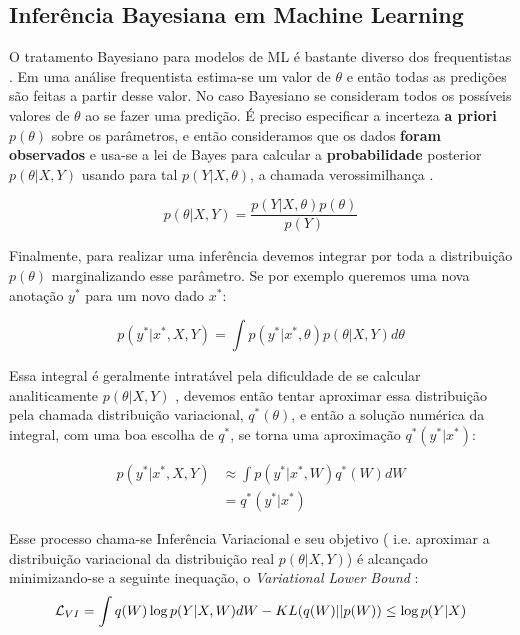 \subsection{Inferência Bayesiana em Machine Learning}
\label{sec:bayesinf}
O tratamento Bayesiano para modelos de ML é bastante diverso dos frequentistas \citep{dlbook}.
Em uma análise frequentista estima-se um valor de $\theta$ e então todas as
predições são feitas a partir desse valor. No caso Bayesiano se consideram todos
os possíveis valores de $\theta$ ao se fazer uma predição. É preciso especificar
a incerteza \textbf{a priori} $p(\theta)$ sobre os parâmetros, e então
consideramos que os dados \textbf{foram observados} e usa-se a lei de Bayes para
calcular a \textbf{probabilidade} posterior $p(\theta | X,Y)$ usando para tal
$p(Y |X, \theta)$, a chamada verossimilhança \citep{bayesml}. 

\[    p(\theta | X,Y) = \frac{p(Y| X,\theta) p(\theta)}{p(Y)}   \]

Finalmente, para realizar uma inferência devemos integrar por toda a distribuição $p(\theta)$ marginalizando esse parâmetro. Se por exemplo queremos uma nova anotação $y^*$ para um novo dado $x^*$:


\begin{equation}
  \label{eq:int}
p(y^* | x^* , X,Y) = \int  p(y^* | x^*,\theta) p(\theta | X,Y)  d\theta 
\end{equation}

Essa integral é geralmente intratável pela dificuldade de se calcular
analiticamente $p(\theta | X,Y)$ \citep{ubertime}, devemos então tentar aproximar essa distribuição
pela chamada distribuição variacional, $q^*(\theta)$, e então a solução numérica da integral, com uma boa escolha de $q^{*}$, se torna uma aproximação $q^{*}(y^{*}| x^{*})$: 

\begin{align*}
  \label {eq:pq}
    p(y^* | x^* , X,Y) &\approx \int  p(y^* | x^*,W) q^*(W)dW \\
                       &= q^*(y^* | x^*)
\end{align*}

Esse processo chama-se Inferência Variacional e seu objetivo ( i.e. aproximar a distribuição variacional da distribuição real $p(\theta | X,Y)$)
é alcançado minimizando-se a seguinte inequação, o \textit{Variational Lower Bound} \citep{bayesml}: \\

\begin{equation}
  \label {eq:ine}
  \mathcal{L}_{VI} = \int q(W) \log p(Y | X,W)dW - \mathnormal{KL}(q(W) ||p(W)) \\
                  \leq \log p(Y|X) 
\end{equation}



